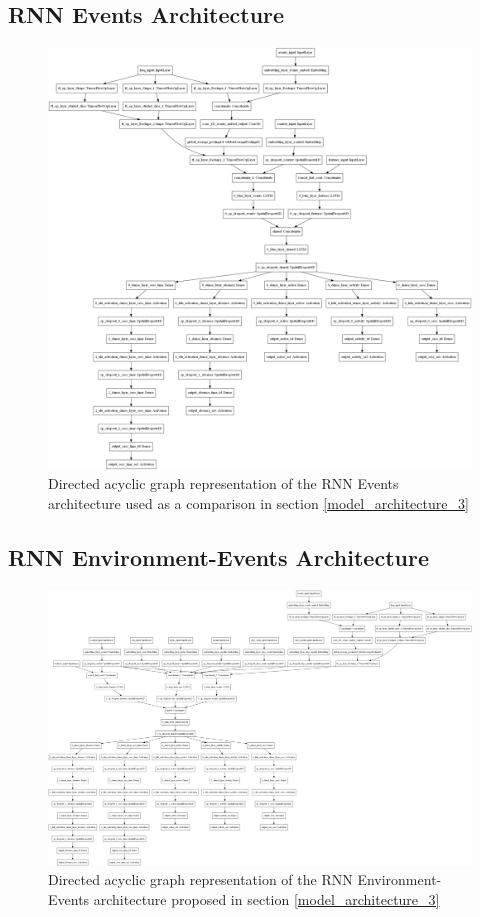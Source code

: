 \subsection{RNN Events Architecture}
\begin{figure}[H]
\centering
\includegraphics[width=\textwidth,height=0.7\textheight,keepaspectratio]{images/appendix_B/rnn_even_3.png}
\caption[\textbf{RNN Events DAG - Section \ref{model_architecture_3}}]{Directed acyclic graph representation of the RNN Events architecture used as a comparison in section \ref{model_architecture_3}}
\label{rnn_even_dag}
\end{figure}

\subsection{RNN Environment-Events Architecture}
\begin{figure}[H]
\centering
\includegraphics[width=\textwidth,height=0.7\textheight,keepaspectratio]{images/appendix_B/rnn_env_even_3.png}
\caption[\textbf{RNN Environment-Events DAG - Section \ref{model_architecture_3}}]{Directed acyclic graph representation of the RNN Environment-Events architecture proposed in section \ref{model_architecture_3}}
\label{rnn_env_even_dag}
\end{figure}